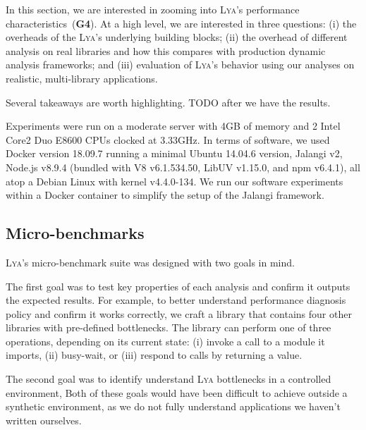 \documentclass[letterpaper,twocolumn,10pt]{article}
\newcommand{\sx}[1]{(\S\ref{#1})}
\newcommand{\sys}{{\scshape Lya}\xspace}
\newcommand{\goal}[1]{(\textbf{G#1})\xspace}
\newcommand{\fixme}[1]{{\color{red}#1}}
\begin{document}
In this section, we are interested in zooming into \sys's performance characteristics~\goal{4}.
At a high level, we are interested in three questions:
(i) the overheads of the \sys's underlying building blocks;
(ii) the overhead of different analysis on real libraries and how this compares with production dynamic analysis frameworks; and
(iii) evaluation of \sys's behavior using our analyses on realistic, multi-library applications.

Several takeaways are worth highlighting.
\fixme{TODO after we have the results.}

Experiments were run on a moderate server with 4GB of memory and 2 Intel Core2 Duo E8600 CPUs clocked at 3.33GHz.
In terms of software, we used Docker version 18.09.7 running \fixme{a minimal Ubuntu 14.04.6 version}, Jalangi \fixme{v2}, Node.js v8.9.4 (bundled with V8 v6.1.534.50, LibUV v1.15.0, and npm v6.4.1), all atop a Debian Linux with kernel v4.4.0-134.
We run our software experiments within a Docker container to simplify the setup of the Jalangi framework.

\subsection{Micro-benchmarks}
\label{micro}

\sys's micro-benchmark suite was designed with two goals in mind.

The first goal was to test key properties of each analysis and confirm it outputs the expected results.
For example, to better understand performance diagnosis policy and confirm it works correctly, we craft a library that contains four other libraries with pre-defined bottlenecks.
The library can perform one of three operations, depending on its current state:
  (i) invoke a call to a module it imports,
  (ii) busy-wait, or
  (iii) respond to calls by returning a value.

The second goal was to identify understand \sys bottlenecks in a controlled environment, 
Both of these goals would have been difficult to achieve outside a synthetic environment, as we do not fully understand applications we haven't written ourselves.
\end{document}
